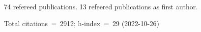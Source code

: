 74 refereed publications. 13 refeered publications as first author.

Total citations~=~2912; h-index~=~29 (2022-10-26)